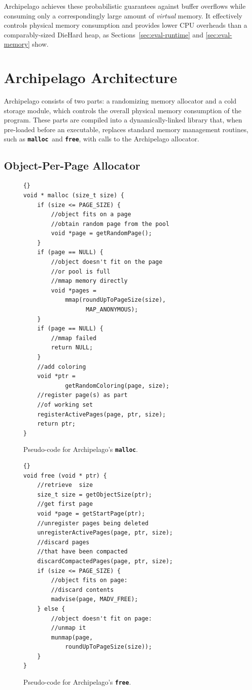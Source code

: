 \documentclass{acm_proc_article-sp}
\newcommand{\cfunction}[1]{{\bf \tt #1}}
\newcommand{\malloc}{\cfunction{malloc}}
\newcommand{\free}{\cfunction{free}}
\begin{document}
Archipelago achieves these probabilistic guarantees against buffer
overflows while consuming only a correspondingly large amount of
\emph{virtual} memory. It effectively controls physical memory
consumption and provides lower CPU overheads than a comparably-sized
DieHard heap, as Sections~\ref{sec:eval-runtime} and
\ref{sec:eval-memory} show.


\section{Archipelago Architecture}

\label{sec:qih}

\noindent
Archipelago consists of two parts: a randomizing memory allocator and
a cold storage module, which controls the overall physical memory
consumption of the program. These parts are compiled into a
dynamically-linked library that, when pre-loaded before an executable,
replaces standard memory management routines, such as \malloc\ and
\free, with calls to the Archipelago allocator.


\subsection{Object-Per-Page Allocator}
\label{sec:allocator}

\begin{figure}[!t]
\label{fig:malloc}
\begin{lstlisting}[frame=trbl]{}
void * malloc (size_t size) {
	if (size <= PAGE_SIZE) {
		//object fits on a page
		//obtain random page from the pool
		void *page = getRandomPage(); 
	}
	if (page == NULL) { 
		//object doesn't fit on the page
		//or pool is full
		//mmap memory directly
		void *pages = 
			mmap(roundUpToPageSize(size),
				  MAP_ANONYMOUS);
	}	
	if (page == NULL) {
		//mmap failed
		return NULL;
	}
	//add coloring 
	void *ptr = 
			getRandomColoring(page, size);
	//register page(s) as part 
	//of working set
	registerActivePages(page, ptr, size);
	return ptr;		
}
\end{lstlisting}
\caption{Pseudo-code for Archipelago's \malloc.}
\end{figure}

\begin{figure}[!t]
\label{fig:free}
\begin{lstlisting}[frame=trbl]{}
void free (void * ptr) {
	//retrieve  size
	size_t size = getObjectSize(ptr);
	//get first page
	void *page = getStartPage(ptr);
	//unregister pages being deleted
	unregisterActivePages(page, ptr, size);
	//discard pages 
	//that have been compacted
	discardCompactedPages(page, ptr, size);
	if (size <= PAGE_SIZE) { 
		//object fits on page:
		//discard contents
		madvise(page, MADV_FREE); 
	} else { 
		//object doesn't fit on page:
		//unmap it
		munmap(page, 
			roundUpToPageSize(size));
	}
}
\end{lstlisting}
\caption{Pseudo-code for Archipelago's \free.}
\end{figure}
\end{document}
